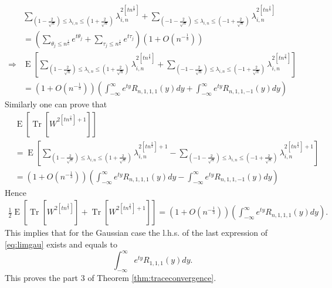 \documentclass[12pt]{article}
\numberwithin{equation}{section}
\numberwithin{equation}{section}
\theoremstyle{definition}
\DeclareMathOperator{\E}{E} \DeclareMathOperator{\var}{Var}
\DeclareMathOperator{\Tr}{Tr}
\renewcommand{\1}{\bf 1}
\begin{document}
\begin{equation}\label{eq:limgau}
\begin{split}
&\sum_{\left(1- \frac{2}{\sqrt{n}}\right)\le \lambda_{i,n}\le \left( 1+ \frac{2}{\sqrt{n}} \right)} \lambda_{i,n}^{2[tn^{\frac{2}{3}}]} + \sum_{\left( -1 - \frac{2}{\sqrt{n}} \right)\le \lambda_{i,n}\le \left( -1 + \frac{2}{\sqrt{n}} \right)}\lambda_{i,n}^{2[tn^{\frac{2}{3}}]}\\
& = \left(\sum_{\theta_{j} \le n^{\frac{1}{6}}} e^{t\theta_{j}} + \sum_{\tau_{j}\le n^{\frac{1}{6}}} e^{t \tau_{j}}\right)\left(1+ O \left(  n^{-\frac{1}{3}}\right)\right)\\
\Rightarrow & \E\left[ \sum_{\left(1- \frac{2}{\sqrt{n}}\right)\le \lambda_{i,n}\le \left( 1+ \frac{2}{\sqrt{n}} \right)} \lambda_{i,n}^{2[tn^{\frac{2}{3}}]} + \sum_{\left( -1 - \frac{2}{\sqrt{n}} \right)\le \lambda_{i,n}\le \left( -1 + \frac{2}{\sqrt{n}} \right)}\lambda_{i,n}^{2[tn^{\frac{2}{3}}]}  \right]\\
& = \left(1+ O\left( n^{-\frac{1}{3}} \right)\right)\left(\int_{-\infty}^{\infty} e^{ty} R_{n,1,1,1}(y)dy + \int_{-\infty}^{\infty} e^{ty} R_{n,1,1,-1}(y)dy \right)
\end{split}
\end{equation} 
Similarly one can prove that 
\begin{equation}
\begin{split}
&\E\left[ \Tr\left[W^{2[tn^{\frac{2}{3}}]+1}\right]  \right]\\
&= \E\left[ \sum_{\left(1- \frac{2}{\sqrt{n}}\right)\le \lambda_{i,n}\le \left( 1+ \frac{2}{\sqrt{n}} \right)} \lambda_{i,n}^{2[tn^{\frac{2}{3}}]+1} - \sum_{\left( -1 - \frac{2}{\sqrt{n}} \right)\le \lambda_{i,n}\le \left( -1 + \frac{2}{\sqrt{n}} \right)}\lambda_{i,n}^{2[tn^{\frac{2}{3}}]+1} \right]\\
&= \left(1+ O\left( n^{-\frac{1}{3}} \right)\right)\left(\int_{-\infty}^{\infty} e^{ty} R_{n,1,1,1}(y)dy - \int_{-\infty}^{\infty} e^{ty}R_{n,1,1,-1}(y)dy  \right)
\end{split}
\end{equation}
Hence 
\begin{equation}
\begin{split}
\frac{1}{2}\E\left[\Tr\left[ W^{2[tn^{\frac{2}{3}}]} \right]+ \Tr \left[ W^{2[tn^{\frac{2}{3}}]+1} \right]\right]= \left( 1+ O\left(n^{-\frac{1}{3}}\right) \right)\left(\int_{-\infty}^{\infty} e^{ty} R_{n,1,1,1}(y)dy\right).
\end{split}
\end{equation}
This implies that for the Gaussian case the l.h.s. of the last expression of \eqref{eq:limgau} exists and equals to 
\begin{equation}
\int_{-\infty}^{\infty} e^{ty} R_{1,1,1}(y)dy.
\end{equation}
This proves the part 3 of Theorem \ref{thm:traceconvergence}.
\end{document}
